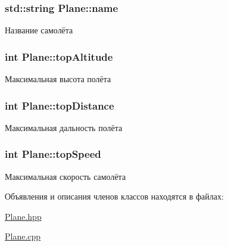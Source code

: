 \subsubsection[{\texorpdfstring{name}{name}}]{\setlength{\rightskip}{0pt plus 5cm}std\+::string Plane\+::name\hspace{0.3cm}{\ttfamily [private]}}\hypertarget{class_plane_a7db2211acd4f4b6506c3374889e57b7c}{}\label{class_plane_a7db2211acd4f4b6506c3374889e57b7c}


Название самолёта 

\subsubsection[{\texorpdfstring{top\+Altitude}{topAltitude}}]{\setlength{\rightskip}{0pt plus 5cm}int Plane\+::top\+Altitude\hspace{0.3cm}{\ttfamily [private]}}\hypertarget{class_plane_a3a1d46e422f1118ec2cd5b6c94849e73}{}\label{class_plane_a3a1d46e422f1118ec2cd5b6c94849e73}


Максимальная высота полёта 

\subsubsection[{\texorpdfstring{top\+Distance}{topDistance}}]{\setlength{\rightskip}{0pt plus 5cm}int Plane\+::top\+Distance\hspace{0.3cm}{\ttfamily [private]}}\hypertarget{class_plane_a58a0908a45645450334d05f5fb2fa80f}{}\label{class_plane_a58a0908a45645450334d05f5fb2fa80f}


Максимальная дальность полёта 

\subsubsection[{\texorpdfstring{top\+Speed}{topSpeed}}]{\setlength{\rightskip}{0pt plus 5cm}int Plane\+::top\+Speed\hspace{0.3cm}{\ttfamily [private]}}\hypertarget{class_plane_a92c9fa6e33294c3fcbfb5819c9ece8fc}{}\label{class_plane_a92c9fa6e33294c3fcbfb5819c9ece8fc}


Максимальная скорость самолёта 



Объявления и описания членов классов находятся в файлах\+:\begin{DoxyCompactItemize}
\item 
\hyperlink{_plane_8hpp}{Plane.\+hpp}\item 
\hyperlink{_plane_8cpp}{Plane.\+cpp}\end{DoxyCompactItemize}
